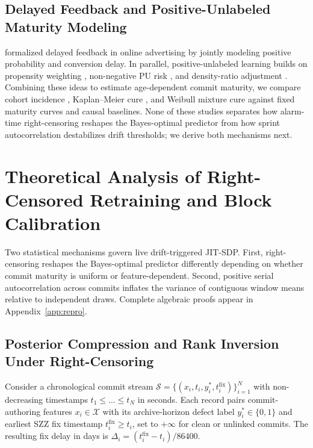 \documentclass[pdflatex,sn-basic]{sn-jnl}
\theoremstyle{definition}
\theoremstyle{plain}
\begin{document}
\subsection{Delayed Feedback and Positive-Unlabeled Maturity Modeling}
\label{sec:rel_pu}

\citet{chapelle2014modeling} formalized delayed feedback in online advertising by jointly modeling positive probability and conversion delay. In parallel, positive-unlabeled learning builds on propensity weighting \citep{elkan2008learning,bekker2020learning}, non-negative PU risk \citep{kiryo2017positive}, and density-ratio adjustment \citep{sugiyama2008direct}. Combining these ideas to estimate age-dependent commit maturity, we compare cohort incidence \citep{lyndenbell1971method}, Kaplan--Meier cure \citep{kaplan1958nonparametric}, and Weibull mixture cure \citep{boag1949cure,farewell1982cure} against fixed maturity curves and causal baselines. None of these studies separates how alarm-time right-censoring reshapes the Bayes-optimal predictor from how sprint autocorrelation destabilizes drift thresholds; we derive both mechanisms next.

\section{Theoretical Analysis of Right-Censored Retraining and Block Calibration}
\label{sec:theory}

Two statistical mechanisms govern live drift-triggered JIT-SDP. First, right-censoring reshapes the Bayes-optimal predictor differently depending on whether commit maturity is uniform or feature-dependent. Second, positive serial autocorrelation across commits inflates the variance of contiguous window means relative to independent draws. Complete algebraic proofs appear in Appendix~\ref{app:repro}.

\subsection{Posterior Compression and Rank Inversion Under Right-Censoring}
\label{sec:theory_poison}

Consider a chronological commit stream $\mathcal{S} = \{(x_i, t_i, y_i^*, t_i^{\text{fix}})\}_{i=1}^N$ with non-decreasing timestamps $t_1 \le \dots \le t_N$ in seconds. Each record pairs commit-authoring features $x_i \in \mathcal{X}$ with its archive-horizon defect label $y_i^* \in \{0, 1\}$ and earliest SZZ fix timestamp $t_i^{\text{fix}} \ge t_i$, set to $+\infty$ for clean or unlinked commits. The resulting fix delay in days is $\Delta_i = (t_i^{\text{fix}} - t_i)/86400$.
\end{document}

